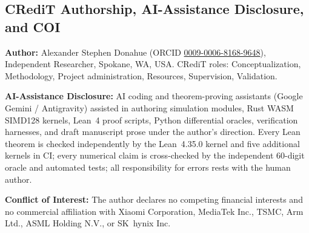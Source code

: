 \documentclass[11pt,a4paper]{amsart}
\theoremstyle{remark}
\begin{document}
\subsection{CRediT Authorship, AI-Assistance Disclosure, and COI}
\textbf{Author:} Alexander Stephen Donahue (ORCID
\href{https://orcid.org/0009-0006-8168-9648}{0009-0006-8168-9648}),
Independent Researcher, Spokane, WA, USA. CRediT roles: Conceptualization,
Methodology, Project administration, Resources, Supervision, Validation.

\textbf{AI-Assistance Disclosure:} AI coding and theorem-proving assistants
(Google Gemini / Antigravity) assisted in authoring simulation modules, Rust
WASM SIMD128 kernels, Lean~4 proof scripts, Python differential oracles,
verification harnesses, and draft manuscript prose under the author's
direction. Every Lean theorem is checked independently by the Lean~4.35.0
kernel and five additional kernels in CI; every numerical claim is
cross-checked by the independent 60-digit oracle and automated tests; all
responsibility for errors rests with the human author.

\textbf{Conflict of Interest:} The author declares no competing financial
interests and no commercial affiliation with Xiaomi Corporation, MediaTek Inc.,
TSMC, Arm Ltd., ASML Holding N.V., or SK~hynix Inc.



\end{document}
